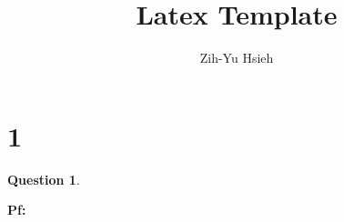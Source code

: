 \documentclass{article}
\title{Latex Template}
\author{Zih-Yu Hsieh}
\newtheorem{question}{Question}
\begin{document}
\maketitle

\section*{1}

\begin{myBox}[]{}
    \begin{question}
        
    \end{question}
\end{myBox}

\textbf{Pf:}

\break
\end{document}
